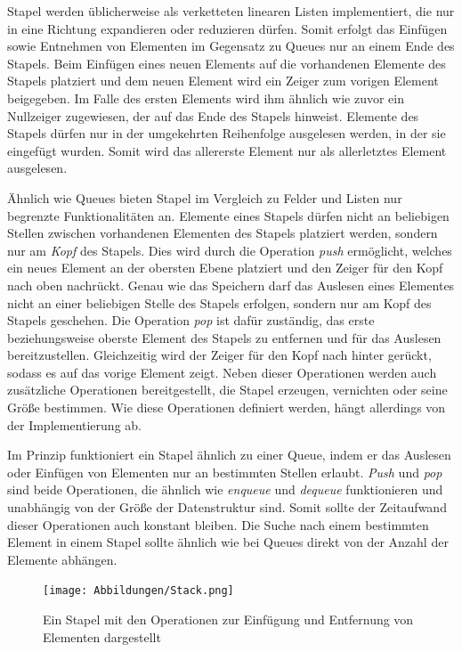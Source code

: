 Stapel werden üblicherweise als verketteten linearen Listen implementiert, die nur in eine Richtung expandieren oder reduzieren dürfen. Somit erfolgt das Einfügen sowie Entnehmen von Elementen im Gegensatz zu Queues nur an einem Ende des Stapels. Beim Einfügen eines neuen Elements auf die vorhandenen Elemente des Stapels platziert und dem neuen Element wird ein Zeiger zum vorigen Element beigegeben. Im Falle des ersten Elements wird ihm ähnlich wie zuvor ein Nullzeiger zugewiesen, der auf das Ende des Stapels hinweist. Elemente des Stapels dürfen nur in der umgekehrten Reihenfolge ausgelesen werden, in der sie eingefügt wurden. Somit wird das allererste Element nur als allerletztes Element ausgelesen. \autocite[363]{gumm_band_2016}

Ähnlich wie Queues bieten Stapel im Vergleich zu Felder und Listen nur begrenzte Funktionalitäten an. Elemente eines Stapels dürfen nicht an beliebigen Stellen zwischen vorhandenen Elementen des Stapels platziert werden, sondern nur am \textit{Kopf} des Stapels. Dies wird durch die Operation \textit{push} ermöglicht, welches ein neues Element an der obersten Ebene platziert und den Zeiger für den Kopf nach oben nachrückt. Genau wie das Speichern darf das Auslesen eines Elementes nicht an einer beliebigen Stelle des Stapels erfolgen, sondern nur am Kopf des Stapels geschehen. Die Operation \textit{pop} ist dafür zuständig, das erste beziehungsweise oberste Element des Stapels zu entfernen und für das Auslesen bereitzustellen. Gleichzeitig wird der Zeiger für den Kopf nach hinter gerückt, sodass es auf das vorige Element zeigt. Neben dieser Operationen werden auch zusätzliche Operationen bereitgestellt, die Stapel erzeugen, vernichten oder seine Größe bestimmen. Wie diese Operationen definiert werden, hängt allerdings von der Implementierung ab. \autocite[614]{ernst_grundkurs_2020} \autocite[45-46]{ollmert_datenstrukturen_2020}

Im Prinzip funktioniert ein Stapel ähnlich zu einer Queue, indem er das Auslesen oder Einfügen von Elementen nur an bestimmten Stellen erlaubt. \textit{Push} und \textit{pop} sind beide Operationen, die ähnlich wie \textit{enqueue} und \textit{dequeue} funktionieren und unabhängig von der Größe der Datenstruktur sind. Somit sollte der Zeitaufwand dieser Operationen auch konstant bleiben. Die Suche nach einem bestimmten Element in einem Stapel sollte ähnlich wie bei Queues direkt von der Anzahl der Elemente abhängen.

\begin{figure}[t]
	\texttt{[image: Abbildungen/Stack.png]}
	\centering
	\caption[Stapel]{Ein Stapel mit den Operationen zur Einfügung und Entfernung von Elementen dargestellt \autocite[371]{gumm_band_2016}}
	\label{fig: stack}
\end{figure}

